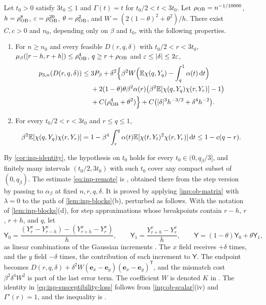 \begin{proposition}\label{inp:ob-remote}
Let $t_0>0$ satisfy $3t_0\le1$ and $\Gamma(t)=t$ for $t_0/2<t<3t_0$. Let
$\rho_{\rm OB}=n^{-1/10000}$, $h=\rho_{\rm OB}^8$, $\varepsilon=\rho_{\rm OB}^{20}$,
$\theta=\rho_{\rm OB}^2$, and $W=(2(1-\theta)^2+\theta^2)/h$. There exist $C,c>0$
and $n_0$, depending only on $\beta$ and $t_0$, with the following properties.
\begin{enumerate}[label=\textup{(\roman*)}]
\item For $n\ge n_0$ and every feasible $D(r,q,\delta)$ with $t_0/2<r<3t_0$,
 $\mu_\beta([r-h,r+h])\le\rho_{\rm OB}^4$, $q\ge r+\rho_{\rm OB}$ and
 $\varepsilon\le\lvert \delta\rvert\le2\varepsilon$,
 \begin{equation}\label{eq:inp-remote}
 \begin{split}
  p_{3,n}(D(r,q,\delta))\le{}&3P_\beta
  +\delta^2\Bigl\{\beta^2W\Bigl(\mathbb E\chi(q,Y_q)-\int_q^1\alpha(t)\,\mathrm d t\Bigr)\\
  &+2(1-\theta)\theta\beta^2\alpha(r)\bigl(\beta^2\mathbb E[\chi(q,Y_q)\chi(r,Y_r)]-1\bigr)\\
  &+C(\rho_{\rm OB}^4+\theta^2)\Bigr\}
  +C\bigl(\lvert \delta\rvert^3h^{-3/2}+\delta^4h^{-2}\bigr).
 \end{split}
 \end{equation}
\item For every $t_0/2<r<3t_0$ and $r\le q\le1$,
 \begin{equation}\label{eq:inp-susceptibility-loss}
  \beta^2\mathbb E[\chi(q,Y_q)\chi(r,Y_r)]
  =1-\beta^4\int_r^q\alpha(t)\mathbb E[\chi(t,Y_t)^2\chi(r,Y_r)]\,\mathrm d t
  \le1-c(q-r).
 \end{equation}
\end{enumerate}
\end{proposition}

By \cref{cor:inp-identity}, the hypothesis on $t_0$ holds for every $t_0\in(0,q_\beta/3]$,
and finitely many intervals $(t_0/2,3t_0)$ with such $t_0$ cover any compact
subset of $(0,q_\beta)$. The estimate \eqref{eq:inp-remote} is
\cite[(7.30)]{oai-barriers}, obtained there from the step version
\cite[(7.29)]{oai-barriers} by passing to $\alpha_\beta$ at fixed $n,r,q,\delta$.
It is proved by applying \cref{inp:ob-matrix} with $\lambda=0$ to the path of
\cref{lem:inp-blocks}(b), perturbed as follows. With the notation of \cref{lem:inp-blocks}(d), for step
approximations whose breakpoints contain $r-h$, $r$, $r+h$, and $q$, let
\[
 \mathsf Y_0=\frac{(Y^x_r-Y^x_{r-h})-(Y^x_{r+h}-Y^x_r)}{h},\qquad
 \mathsf Y_1=\frac{Y^v_{r+h}-Y^v_r}{h},\qquad
 \mathsf Y=(1-\theta)\mathsf Y_0+\theta\mathsf Y_1,
\]
as linear combinations of the Gaussian increments \cite[(7.8)]{oai-barriers}.
The $x$ field receives $+\delta$ times, and the $y$ field $-\delta$ times, the
contribution of each increment to $\mathsf Y$. The endpoint
becomes $D(r,q,\delta)+\delta^2W(\mathbf e_x-\mathbf e_y)(\mathbf e_x-\mathbf
e_y)^{\mathsf T}$, and the mismatch cost $\beta^2\delta^4W^2$
\cite[(7.13)]{oai-barriers} is part of the last error term. The coefficient $W$
is denoted $K$ in \cite{oai-barriers}. The identity in
\eqref{eq:inp-susceptibility-loss} follows from \cref{inp:ob-scalar}(iv) and
$\Gamma'(r)=1$, and the inequality is \cite[(7.31)]{oai-barriers}.

